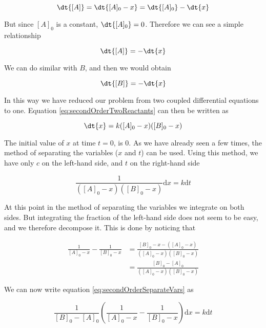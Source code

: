 \begin{equation}
  \dt{[A]} = \dt{[A]_0 - x} = \dt{[A]_0} - \dt{x}
\end{equation}

But since $[A]_0$ is a constant, $\dt{[A]_0} = 0$. Therefore we can see a simple relationship

\begin{equation}
  \dt{[A]} = - \dt{x}
\end{equation}

We can do similar with $B$, and then we would obtain

\begin{equation}
  \dt{[B]} = - \dt{x}
\end{equation}

In this way we have reduced our problem from two coupled differential equations to one. Equation \ref{eq:secondOrderTwoReactants} can then be written as

\begin{equation}
  \dt{x} = k([A]_0 - x)([B]_0 - x)
\end{equation}

The initial value of $x$ \ie at time $t = 0$, is $0$. As we have already seen a few times, the method of separating the variables ($x$ and $t$) can be used. Using this method, we have only $c$ on the left-hand side, and $t$ on the right-hand side \ie

\begin{equation}
  \label{eq:secondOrderSeparateVars}
  \frac{1}{([A]_0 - x)([B]_0 - x)} \mathrm{d}x = k\mathrm{d}t
\end{equation}

At this point in the method of separating the variables we integrate on both sides. But integrating the fraction of the left-hand side does not seem to be easy, and we therefore decompose it. This is done by noticing that

\begin{align*}
  \frac{1}{[A]_0 - x} - \frac{1}{[B]_0 - x} &= \frac{[B]_0 - x - ([A]_0 - x)}{([A]_0 - x)([B]_0 - x)} \\
    &= \frac{[B]_0 - [A]_0}{([A]_0 - x)([B]_0 - x)}
\end{align*}

We can now write equation \ref{eq:secondOrderSeparateVars} as

\begin{equation}
  \frac{1}{[B]_0 - [A]_0} \left( \frac{1}{[A]_0 - x} - \frac{1}{[B]_0 - x} \right) \mathrm{d}x = k\mathrm{d}t
\end{equation}

